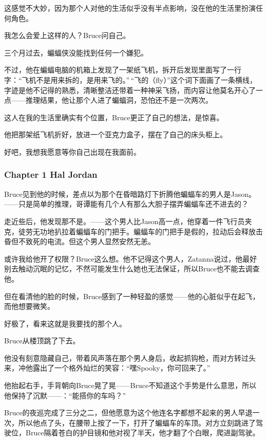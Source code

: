 \documentclass[../main.tex]{subfiles}
\begin{document}
这感觉不大妙，因为那个人对他的生活似乎没有半点影响，没在他的生活里扮演任何角色。

我怎么会爱上这样的人？Bruce问自己。

三个月过去，蝙蝠侠没能找到任何一个嫌犯。

不过，他在蝙蝠电脑的机箱上发现了一架纸飞机，拆开后发现里面写了一行字：“飞机不是用来拆的，是用来飞的。”\,“飞的（fly）”这个词下面画了一条横线，字迹是他不记得的熟悉，清晰整洁还带着一种神采飞扬，而内容让他莫名开心了一点——推理结果，他让那个人进了蝙蝠洞，恐怕还不是一次两次。

这人在我的生活里确实有个位置，Bruce更正了自己的想法，是惊喜。

他把那架纸飞机折好，放进一个亚克力盒子，摆在了自己的床头柜上。

好吧，我想我愿意等你自己出现在我面前。

\hypertarget{chapter-1-hal-jordan}{%
  \subsubsection{Chapter 1 Hal Jordan}\label{chapter-1-hal-jordan}}

Bruce见到他的时候，差点以为那个在昏暗路灯下折腾他蝙蝠车的男人是Jason。——只是简单的推理，哥谭能有几个人有那么大胆子摆弄蝙蝠车还不进去的？

走近些后，他发现那不是。——这个男人比Jason高一点，他穿着一件飞行员夹克，徒劳无功地扒拉着蝙蝠车的门把手。蝙蝠车的门把手是假的，拉动后会释放击昏但不致死的电流。但这个男人显然安然无恙。

或许我给他开了权限？Bruce这么想。他不记得这个男人，Zatanna说过，他最好别去触动沉眠的记忆，不然可能发生什么她也无法保证，所以Bruce也不能去调查他。

但在看清他的脸的时候，Bruce感到了一种轻盈的感觉——他的心脏似乎在起飞，而他想要微笑。

好极了，看来这就是我要找的那个人。

Bruce从楼顶跳了下去。

他没有刻意隐藏自己，带着风声落在那个男人身后，收起抓钩枪，而对方转过头来，冲他露出了一个格外灿烂的笑容：“嘿Spooky，你可回来了。”

他抬起右手，手背朝向Bruce晃了晃——Bruce不知道这个手势是什么意思，所以他保持了沉默——：“能搭你的车吗？”

Bruce的夜巡完成了三分之二，但他愿意为这个他连名字都想不起来的男人早退一次，所以他点了头，在腰带上按了一下，打开了蝙蝠车的车顶。对方立刻跳进了驾驶位，Bruce隔着苍白的护目镜和他对视了半天，他才翻了个白眼，爬进副驾驶。
\end{document}
